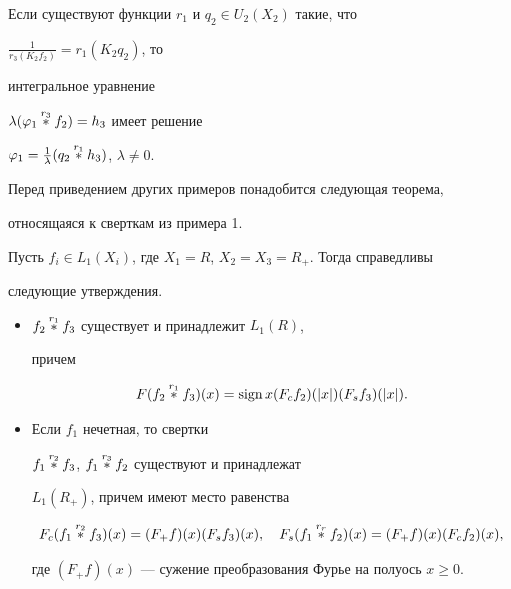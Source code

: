 \begin{cor}


Если существуют функции $r_1$ и $q_2\in U_2(X_2)$ такие, что


$\frac{1}{r_3(K_2f_2)}=r_1(K_2q_2)$, то


интегральное уравнение


$\lambda(\varphi_1\overset{r_3}{\ast}{}f_2)=h_3$ имеет решение


$\varphi_1=\frac{1}{\lambda}(q_2\overset{r_1}{\ast}{}h_3)$, $\lambda\ne 0$.


\end{cor}





Перед приведением других примеров понадобится следующая теорема,


относящаяся к сверткам из примера 1.





\begin{thm}


Пусть $f_i\in L_1(X_i)$, где $X_1=R$, $X_2=X_3=R_+$. Тогда справедливы


следующие утверждения.


\begin{itemize}


\item[1.] $f_2\overset{r_1}{\ast}{}f_3$ существует и принадлежит $L_1(R)$,


причем


$$


F(f_2\up{r_1}{}f_3)(x)=\sign x(F_cf_2)(|x|)(F_sf_3)(|x|).


$$


\item[2.] Если $f_1$ нечетная, то свертки


$f_1\overset{r_2}{\ast}{}f_3$, $f_1\overset{r_3}{\ast}{}f_2$ существуют и принадлежат


$L_1(R_+)$, причем имеют место равенства


$$


F_c(f_1\up{r_2}{}f_3)(x)=(F_+f)(x)(F_sf_3)(x),\quad


F_s(f_1\up{r_r}{}f_2)(x)=(F_+f)(x)(F_cf_2)(x),


$$


где $(F_+f)(x)$ --- сужение преобразования Фурье на полуось $x\ge 0$.


\end{itemize}


\end{thm}





